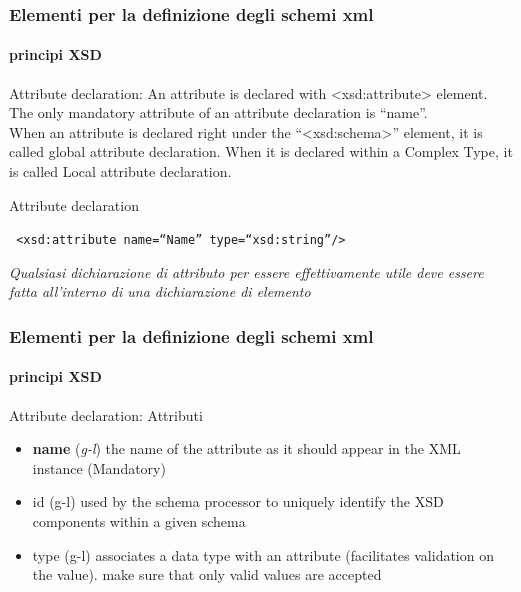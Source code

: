 


\begin{frame}
	\frametitle{Elementi per la definizione degli schemi xml}
	\framesubtitle{principi XSD}
	\addtocounter{nframe}{1}

	\begin{block}{Attribute declaration:}
		An attribute is declared with <xsd:attribute> element. The only mandatory attribute of an attribute declaration is ``name''.
		\\ When an attribute is declared right under the ``<xsd:schema>'' element, it is called global attribute declaration. When it is declared within a Complex Type, it is called Local attribute declaration.
	\end{block}


	\begin{block}{Attribute declaration}

		\texttt{
			<xsd:attribute name=``Name'' type=``xsd:string''/>
		}

	\end{block}
	\textit{Qualsiasi dichiarazione di attributo per essere effettivamente utile deve essere fatta all'interno di una dichiarazione di elemento}

\end{frame}




\begin{frame}
	\frametitle{Elementi per la definizione degli schemi xml}
	\framesubtitle{principi XSD}
	\addtocounter{nframe}{1}

	\begin{block}{Attribute declaration: Attributi}
		\begin{itemize}
			\item \textbf{name} (\textit{g-l}) the name of the attribute as it should appear in the XML instance (Mandatory)
			\item id (g-l) used by the schema processor to uniquely identify the XSD components within a given schema
			\item type (g-l) associates a data type with an attribute (facilitates validation on the value). make sure that only valid values are accepted
		\end{itemize}

	\end{block}


\end{frame}


